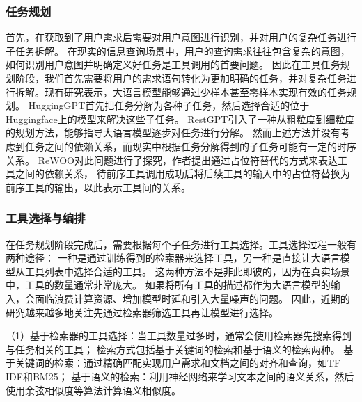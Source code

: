 

\subsubsection{任务规划}

首先，在获取到了用户需求后需要对用户意图进行识别，并对用户的复杂任务进行子任务拆解。
在现实的信息查询场景中，用户的查询需求往往包含复杂的意图，如何识别用户意图并明确定义好任务是工具调用的首要问题。
因此在工具任务规划阶段，我们首先需要将用户的需求语句转化为更加明确的任务，并对复杂任务进行拆解。现有研究\cite{Miao2023}表示，大语言模型能够通过少样本甚至零样本实现有效的任务规划。
HuggingGPT\cite{Shen2023}首先把任务分解为各种子任务，然后选择合适的位于Huggingface上的模型来解决这些子任务。
RestGPT\cite{Song2023}引入了一种从粗粒度到细粒度的规划方法，能够指导大语言模型逐步对任务进行分解。
然而上述方法并没有考虑到任务之间的依赖关系，而现实中根据任务分解得到的子任务可能有一定的时序关系。
ReWOO\cite{xu2023rewoo}对此问题进行了探究，作者提出通过占位符替代的方式来表达工具之间的依赖关系，
待前序工具调用成功后将后续工具的输入中的占位符替换为前序工具的输出，以此表示工具间的关系。

\subsubsection{工具选择与编排}

在任务规划阶段完成后，需要根据每个子任务进行工具选择。工具选择过程一般有两种途径：
一种是通过训练得到的检索器来选择工具，另一种是直接让大语言模型从工具列表中选择合适的工具。
这两种方法不是非此即彼的，因为在真实场景中，工具的数量通常非常庞大。
如果将所有工具的描述都作为大语言模型的输入，会面临浪费计算资源、增加模型时延和引入大量噪声的问题。
因此，近期的研究越来越多地关注先通过检索器筛选工具再让模型进行选择。

（1）基于检索器的工具选择：当工具数量过多时，通常会使用检索器先搜索得到与任务相关的工具；
检索方式包括基于关键词的检索和基于语义的检索两种。
基于关键词的检索：通过精确匹配实现用户需求和文档之间的对齐和查询，如TF-IDF\cite{Jones1972}和BM25\cite{Robertson2009}；
基于语义的检索：利用神经网络来学习文本之间的语义关系，然后使用余弦相似度等算法计算语义相似度。

